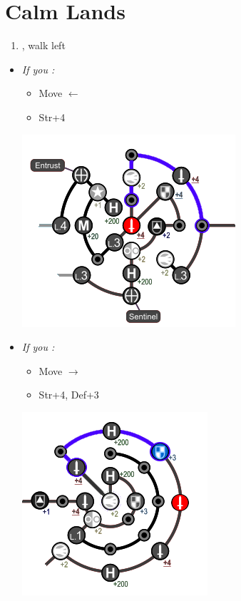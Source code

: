 \chapter{Calm Lands}

\begin{enumerate}
  \item \sd, walk left
\end{enumerate}
\begin{spheregrid}
  \begin{itemize}
  \yunaf
  \item \textit{If you \wonblitz:}
  \begin{itemize}
  \item Move $\leftarrow$
  \item Str+4
  \end{itemize}
  \includegraphics[width=.5\columnwidth]{graphics/yuna_blitz_win_highbridge_2}
  \item \textit{If you \lostblitz:}
  \begin{itemize}
	\item Move $\rightarrow$
  	\item Str+4, Def+3
	\end{itemize}
  \includegraphics[width=.5\columnwidth]{graphics/yuna_blitz_loss_highbridge_2}
\end{itemize}
\end{spheregrid}
